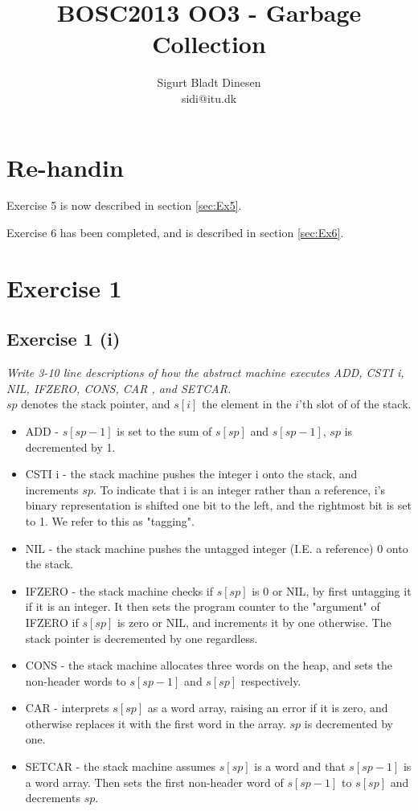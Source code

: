\documentclass[a4paper, titlepage]{article}
\begin{document}
\title{BOSC2013 OO3 - Garbage Collection}
\author{Sigurt Bladt Dinesen \\sidi{@}itu.dk}
\maketitle
\tableofcontents{}
\pagebreak

\section{Re-handin}

Exercise 5 is now described in section \ref{sec:Ex5}.

Exercise 6 has been completed, and is described in section \ref{sec:Ex6}.

\section{Exercise 1}
\subsection{Exercise 1 (i)}
\textit{Write 3-10 line descriptions of how the abstract machine executes ADD,
CSTI i, NIL, IFZERO, CONS, CAR , and SETCAR.}\\

$sp$ denotes the stack pointer, and $s[i]$ the element in the $i$'th slot of of the stack.
\begin{itemize}
	\item ADD - $s[sp-1]$ is set to the sum of $s[sp]$ and $s[sp-1]$, $sp$
		is decremented by 1.
	\item CSTI i - the stack machine pushes the integer i onto the stack,
		and increments $sp$. To indicate that i is an integer rather
		than a reference, i's binary representation is shifted one bit
		to the left, and the rightmost bit is set to 1. We refer to this
		as "tagging".
	\item NIL - the stack machine pushes the untagged integer (I.E. a
		reference) 0 onto the stack.
	\item IFZERO - the stack machine checks if $s[sp]$ is 0 or NIL, by
		first untagging it if it is an integer. It then sets the program
		counter to the "argument" of IFZERO if $s[sp]$ is zero or NIL,
		and increments it by one otherwise. The stack pointer is
		decremented by one regardless.
	\item CONS - the stack machine allocates three words on the heap, and
		sets the non-header words to $s[sp-1]$ and $s[sp]$ respectively.
	\item CAR - interprets $s[sp]$ as a word array, raising an error if it
		is zero, and otherwise replaces it with the first word in the
		array. $sp$ is decremented by one.
	\item SETCAR - the stack machine assumes $s[sp]$ is a word and that
		$s[sp-1]$ is a word array. Then sets the first non-header word
		of $s[sp-1]$ to $s[sp]$ and decrements $sp$.
\end{itemize}
\end{document}
